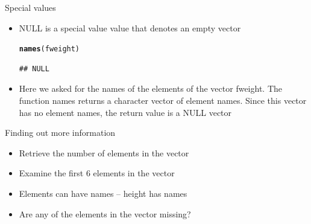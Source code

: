 \documentclass{beamer}\usepackage[]{graphicx}\usepackage[]{color}
\makeatletter
\newcommand{\hlstd}[1]{\textcolor[rgb]{0.345,0.345,0.345}{#1}}%
\newcommand{\hlkwd}[1]{\textcolor[rgb]{0.737,0.353,0.396}{\textbf{#1}}}%
\newenvironment{kframe}{%
 \def\at@end@of@kframe{}%
 \ifinner\ifhmode%
  \def\at@end@of@kframe{\end{minipage}}%
  \begin{minipage}{\columnwidth}%
 \fi\fi%
 \def\FrameCommand##1{\hskip\@totalleftmargin \hskip-\fboxsep
 \colorbox{shadecolor}{##1}\hskip-\fboxsep
     \hskip-\linewidth \hskip-\@totalleftmargin \hskip\columnwidth}%
 \MakeFramed {\advance\hsize-\width
   \@totalleftmargin\z@ \linewidth\hsize
   \@setminipage}}%
 {\par\unskip\endMakeFramed%
 \at@end@of@kframe}
\newenvironment{knitrout}{}{} %
\renewenvironment{knitrout}{\begin{singlespace}}{\end{singlespace}}
\theoremstyle{mystyle}
\makeatother
\begin{document}
\begin{frame}[fragile]{Special values}
\begin{itemize}
\item NULL is a special value value that denotes an empty vector
\begin{knitrout}
\color{fgcolor}\begin{kframe}
\begin{alltt}
\hlkwd{names}\hlstd{(fweight)}
\end{alltt}
\begin{verbatim}
## NULL
\end{verbatim}
\end{kframe}
\end{knitrout}
\item Here we asked for the names of the elements of the vector fweight. The function names returns a character vector of element names. Since this vector has no element names, the return value is a NULL vector
\end{itemize}
\end{frame}

\begin{frame}[fragile]{Finding out more information}
\begin{itemize}
\item Retrieve the number of elements in the vector
\item Examine the first 6 elements in the vector
\item Elements can have names – height has names 
\item Are any of the elements in the vector missing?
\end{itemize}
\end{frame}
\end{document}
